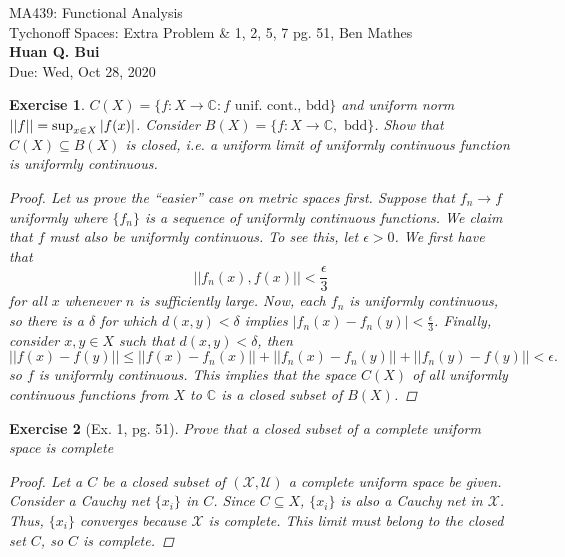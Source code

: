 \documentclass[11pt]{article}
\newtheorem{exercise}{Exercise}
\newcommand{\X}{\mathcal{X}}
\newcommand{\f}[2]{\frac{#1}{#2}}
\begin{document}
\begin{center}
\begin{framed}
{\Large  MA439: Functional Analysis\\
	 Tychonoff Spaces: Extra Problem \& 1, 2, 5, 7 pg. 51, Ben Mathes}\\
$\,$\\
{\Large \bf  Huan Q. Bui\\}
$\,$\\
{\Large Due: Wed, Oct 28, 2020}
\end{framed}
\end{center}



\begin{exercise}
	$C(X) = \{ f: X\to \mathbb{C} : f \text{ unif. cont., bdd} \}$ and uniform norm $|| f || = \sup_{x\in X} \abs{f(x)}$. Consider $B(X) = \{ f: X\to \mathbb{C}, \text{ bdd} \}$. Show that $C(X) \subseteq B(X)$ is closed, i.e. a uniform limit of uniformly continuous function is uniformly continuous.
	\begin{proof}
  		Let us prove the ``easier'' case on metric spaces first. Suppose that $f_n \to f$ uniformly where $\{f_n\}$ is a sequence of uniformly continuous functions. We claim that $f$ must also be uniformly continuous. To see this, let $\epsilon > 0$. We first have that 
		\begin{equation*}
		||f_n(x), f(x)|| < \f{\epsilon}{3}
		\end{equation*}
		for all $x$ whenever $n$ is sufficiently large. Now, each $f_n$ is uniformly continuous, so there is a $\delta$ for which $d(x,y) < \delta$ implies $|f_n(x) - f_n(y)| < \f{\epsilon}{3}$. Finally, consider $x,y\in X$ such that $d(x,y) < \delta$, then 
		\begin{equation*}
		||f(x) - f(y)|| \leq ||f(x) - f_n(x)|| + ||f_n(x) - f_n(y)|| + ||f_n(y) - f(y)|| < \epsilon.
		\end{equation*}
		so $f$ is uniformly continuous. This implies that the space $C(X)$ of all uniformly continuous functions from $X$ to $\mathbb{C}$ is a closed subset of $B(X)$. 
	\end{proof}
\end{exercise}

\begin{exercise}[Ex. 1, pg. 51]
	 Prove that a closed subset of a complete uniform space is complete
	 \begin{proof}
	 	Let a $C$ be a closed subset of $(\X,\mathcal{U})$ a complete uniform space be given. Consider a Cauchy net $\{ x_i \}$ in $C$. Since $C\subseteq X$, $\{ x_i\}$ is also a Cauchy net in $\X$. Thus, $\{ x_i\}$ converges because $\X$ is complete. This limit must belong to the closed set $C$, so $C$ is complete. 
	 \end{proof}
\end{exercise}
\end{document}
